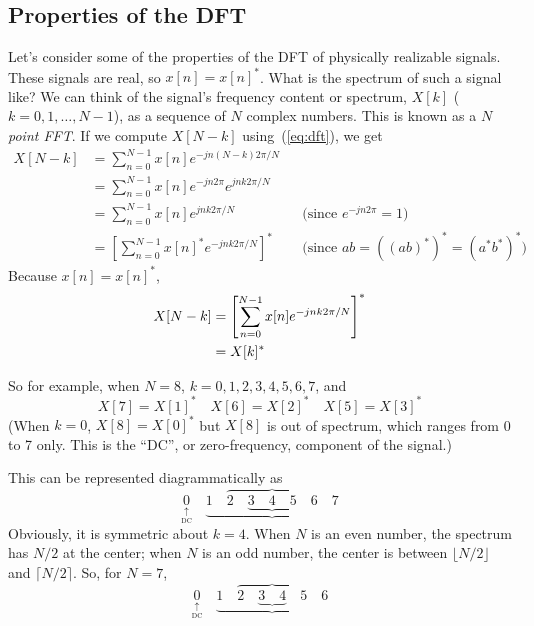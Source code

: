 \subsection{Properties of the DFT}

Let's consider some of the properties of the DFT of physically
realizable signals. These signals are real, so $x[n] = x[n]^*$. What
is the spectrum of such a signal like? We can think of the signal's
frequency content or spectrum, $X[k]$ ($k=0,1,\ldots,N-1$), as a
sequence of $N$ complex numbers. This is known as a \emph{$N$ point
FFT}. If we compute $X[N-k]$ using~(\ref{eq:dft}), we get
\begin{align*}
X[N-k] &= \sum_{n=0}^{N-1} x[n] e^{-j n (N-k) 2\pi/N} \\
&= \sum_{n=0}^{N-1} x[n] e^{-jn2\pi}e^{j n k 2\pi/N} \\
&= \sum_{n=0}^{N-1} x[n] e^{j n k 2\pi/N} &&\text{(since $e^{-jn2\pi}=1$)}\\
&= \left[\sum_{n=0}^{N-1} x[n]^* e^{-j n k 2\pi/N}\right]^* 
   &&\text{(since $ab = ((ab)^*)^* = (a^*b^*)^*$)}
\end{align*}
Because $x[n]=x[n]^*$,
\begin{align}
X[N-k]&= \left[\sum_{n=0}^{N-1} x[n] e^{-j n k 2\pi/N}\right]^* \notag\\
       &= X[k]^*
\end{align}

So for example, when $N=8$, $k=0, 1,2,3,4,5,6,7$, and
\begin{equation}
X[7]=X[1]^* \quad X[6]=X[2]^* \quad X[5]=X[3]^*
\end{equation}
(When $k=0$, $X[8]=X[0]^*$ but $X[8]$ is out of spectrum, which ranges
from 0 to 7 only. This is the ``DC'', or zero-frequency, component of
the signal.)

This can be represented diagrammatically as
\begin{equation}
\underset{\underset{\text{DC}}{\uparrow}}{0} \quad \underbrace{1 \quad
    \overbrace{2 \quad \underbrace{3 \quad 4 \quad 5} \quad 6} \quad 7}
\label{eq:dft8-freqs}
\end{equation}
Obviously, it is symmetric about $k=4$. When $N$ is an even number,
the spectrum has $N/2$ at the center; when $N$ is an odd number, the
center is between $\lfloor N/2 \rfloor$ and $\lceil N/2 \rceil$. So,
for $N=7$,
\begin{equation}
\underset{\underset{\text{DC}}{\uparrow}}{0} \quad \underbrace{1 \quad
  \overbrace{2 \quad \underbrace{3 \quad 4} \quad 5} \quad 6}
\end{equation}   

